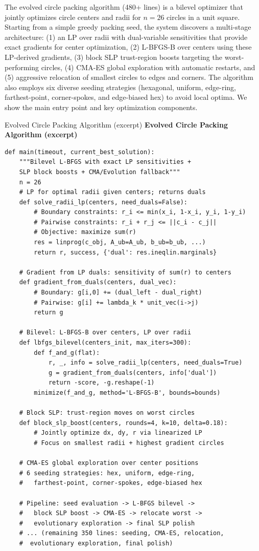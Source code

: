 \documentclass[sigconf]{acmart}
\newenvironment{promptbox}[1][]{%
  \par\smallskip
  \def\promptboxtitle{#1}%
  \begin{snugshade}%
  \ifx\promptboxtitle\empty\else
    \noindent\textbf{\small\promptboxtitle}\par\nobreak\smallskip
  \fi
  \small\ttfamily\noindent\ignorespaces
}{%
  \end{snugshade}%
  \par\smallskip
}
\begin{document}
The evolved circle packing algorithm (480+ lines) is a bilevel optimizer that jointly optimizes circle centers and radii for $n{=}26$ circles in a unit square. Starting from a simple greedy packing seed, the system discovers a multi-stage architecture: (1) an LP over radii with dual-variable sensitivities that provide exact gradients for center optimization, (2) L-BFGS-B over centers using these LP-derived gradients, (3) block SLP trust-region boosts targeting the worst-performing circles, (4) CMA-ES global exploration with automatic restarts, and (5) aggressive relocation of smallest circles to edges and corners. The algorithm also employs six diverse seeding strategies (hexagonal, uniform, edge-ring, farthest-point, corner-spokes, and edge-biased hex) to avoid local optima. We show the main entry point and key optimization components.

\begin{promptbox}[Evolved Circle Packing Algorithm (excerpt)]
\begin{lstlisting}[aboveskip=0pt,belowskip=0pt,numbers=none,frame=none,backgroundcolor=\color{gray!5}]
def main(timeout, current_best_solution):
    """Bilevel L-BFGS with exact LP sensitivities +
    SLP block boosts + CMA/Evolution fallback"""
    n = 26
    # LP for optimal radii given centers; returns duals
    def solve_radii_lp(centers, need_duals=False):
        # Boundary constraints: r_i <= min(x_i, 1-x_i, y_i, 1-y_i)
        # Pairwise constraints: r_i + r_j <= ||c_i - c_j||
        # Objective: maximize sum(r)
        res = linprog(c_obj, A_ub=A_ub, b_ub=b_ub, ...)
        return r, success, {'dual': res.ineqlin.marginals}

    # Gradient from LP duals: sensitivity of sum(r) to centers
    def gradient_from_duals(centers, dual_vec):
        # Boundary: g[i,0] += (dual_left - dual_right)
        # Pairwise: g[i] += lambda_k * unit_vec(i->j)
        return g

    # Bilevel: L-BFGS-B over centers, LP over radii
    def lbfgs_bilevel(centers_init, max_iters=300):
        def f_and_g(flat):
            r, _, info = solve_radii_lp(centers, need_duals=True)
            g = gradient_from_duals(centers, info['dual'])
            return -score, -g.reshape(-1)
        minimize(f_and_g, method='L-BFGS-B', bounds=bounds)

    # Block SLP: trust-region moves on worst circles
    def block_slp_boost(centers, rounds=4, k=10, delta=0.18):
        # Jointly optimize dx, dy, r via linearized LP
        # Focus on smallest radii + highest gradient circles

    # CMA-ES global exploration over center positions
    # 6 seeding strategies: hex, uniform, edge-ring,
    #   farthest-point, corner-spokes, edge-biased hex

    # Pipeline: seed evaluation -> L-BFGS bilevel ->
    #   block SLP boost -> CMA-ES -> relocate worst ->
    #   evolutionary exploration -> final SLP polish
    # ... (remaining 350 lines: seeding, CMA-ES, relocation,
    #  evolutionary exploration, final polish)
\end{lstlisting}
\end{promptbox}
\end{document}
